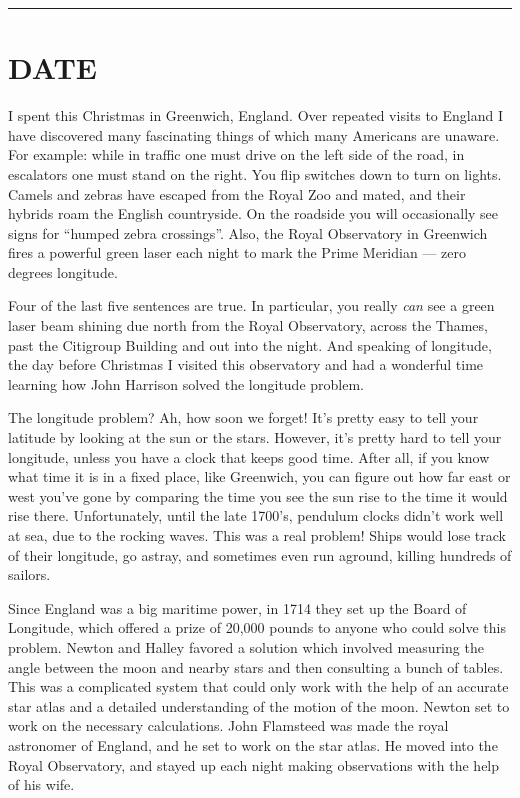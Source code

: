 \documentclass{article}
\begin{document}
\begin{center}\rule{0.5\linewidth}{0.5pt}\end{center}
\hypertarget{week175}{%
\section{DATE}\label{week175}}

I spent this Christmas in Greenwich, England. Over repeated visits to
England I have discovered many fascinating things of which many
Americans are unaware. For example: while in traffic one must drive on
the left side of the road, in escalators one must stand on the right.
You flip switches down to turn on lights. Camels and zebras have escaped
from the Royal Zoo and mated, and their hybrids roam the English
countryside. On the roadside you will occasionally see signs for
``humped zebra crossings''. Also, the Royal Observatory in Greenwich
fires a powerful green laser each night to mark the Prime Meridian ---
zero degrees longitude.

Four of the last five sentences are true. In particular, you really
\emph{can} see a green laser beam shining due north from the Royal
Observatory, across the Thames, past the Citigroup Building and out into
the night. And speaking of longitude, the day before Christmas I visited
this observatory and had a wonderful time learning how John Harrison
solved the longitude problem.

The longitude problem? Ah, how soon we forget! It's pretty easy to tell
your latitude by looking at the sun or the stars. However, it's pretty
hard to tell your longitude, unless you have a clock that keeps good
time. After all, if you know what time it is in a fixed place, like
Greenwich, you can figure out how far east or west you've gone by
comparing the time you see the sun rise to the time it would rise there.
Unfortunately, until the late 1700's, pendulum clocks didn't work well
at sea, due to the rocking waves. This was a real problem! Ships would
lose track of their longitude, go astray, and sometimes even run
aground, killing hundreds of sailors.

Since England was a big maritime power, in 1714 they set up the Board of
Longitude, which offered a prize of 20,000 pounds to anyone who could
solve this problem. Newton and Halley favored a solution which involved
measuring the angle between the moon and nearby stars and then
consulting a bunch of tables. This was a complicated system that could
only work with the help of an accurate star atlas and a detailed
understanding of the motion of the moon. Newton set to work on the
necessary calculations. John Flamsteed was made the royal astronomer of
England, and he set to work on the star atlas. He moved into the Royal
Observatory, and stayed up each night making observations with the help
of his wife.
\end{document}
